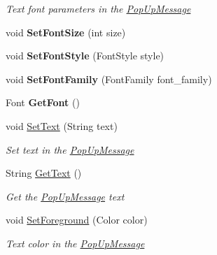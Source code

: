 \begin{DoxyCompactItemize}
\begin{DoxyCompactList}\small\item\em Text font parameters in the \mbox{\hyperlink{class_space_v_i_l_1_1_pop_up_message}{Pop\+Up\+Message}} \end{DoxyCompactList}\item 
\mbox{\label{class_space_v_i_l_1_1_pop_up_message_a2a750a9eaffc05e541b15cf948bb2184}} 
void {\bfseries Set\+Font\+Size} (int size)
\item 
\mbox{\label{class_space_v_i_l_1_1_pop_up_message_adc096dc9987842a2a354ca27b50818c0}} 
void {\bfseries Set\+Font\+Style} (Font\+Style style)
\item 
\mbox{\label{class_space_v_i_l_1_1_pop_up_message_a3d2009def34d0feb01d258963e3b75b6}} 
void {\bfseries Set\+Font\+Family} (Font\+Family font\+\_\+family)
\item 
\mbox{\label{class_space_v_i_l_1_1_pop_up_message_a4da4572e737eafb17f96f98342ebb9ed}} 
Font {\bfseries Get\+Font} ()
\item 
void \mbox{\hyperlink{class_space_v_i_l_1_1_pop_up_message_ae1ec91f0396c2433a08afecb853dae6f}{Set\+Text}} (String text)
\begin{DoxyCompactList}\small\item\em Set text in the \mbox{\hyperlink{class_space_v_i_l_1_1_pop_up_message}{Pop\+Up\+Message}} \end{DoxyCompactList}\item 
String \mbox{\hyperlink{class_space_v_i_l_1_1_pop_up_message_a88fb35dbe3c0ffb09d6ab49d4e179a21}{Get\+Text}} ()
\begin{DoxyCompactList}\small\item\em Get the \mbox{\hyperlink{class_space_v_i_l_1_1_pop_up_message}{Pop\+Up\+Message}} text \end{DoxyCompactList}\item 
void \mbox{\hyperlink{class_space_v_i_l_1_1_pop_up_message_ae46f44949f484301b57b2ee6cb367ee9}{Set\+Foreground}} (Color color)
\begin{DoxyCompactList}\small\item\em Text color in the \mbox{\hyperlink{class_space_v_i_l_1_1_pop_up_message}{Pop\+Up\+Message}} \end{DoxyCompactList}\item 

\end{DoxyCompactItemize}
